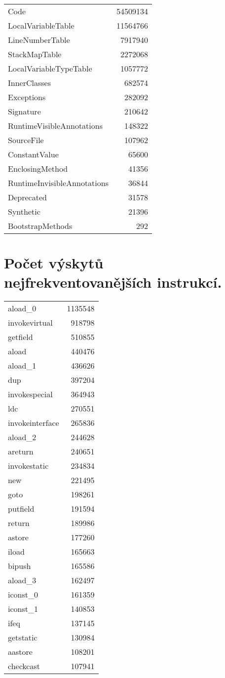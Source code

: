   \begin{tabular}{l r}
	Code	&	54509134	\\
	LocalVariableTable	&	11564766	\\
	LineNumberTable	&	7917940	\\
	StackMapTable	&	2272068	\\
	LocalVariableTypeTable	&	1057772	\\
	InnerClasses	&	682574	\\
	Exceptions	&	282092	\\
	Signature	&	210642	\\
	RuntimeVisibleAnnotations	&	148322	\\
	SourceFile	&	107962	\\
	ConstantValue	&	65600	\\
	EnclosingMethod	&	41356	\\
	RuntimeInvisibleAnnotations	&	36844	\\
	Deprecated	&	31578	\\
	Synthetic	&	21396	\\
	BootstrapMethods	&	292
  \end{tabular}


\section{Počet výskytů nejfrekventovanějších instrukcí.}\label{instf}

  \begin{tabular}{l r}
	aload\_0	&	1135548	\\
	invokevirtual	&	918798	\\
	getfield	&	510855	\\
	aload	&	440476	\\
	aload\_1	&	436626	\\
	dup	&	397204	\\
	invokespecial	&	364943	\\
	ldc	&	270551	\\
	invokeinterface	&	265836	\\
	aload\_2	&	244628	\\
	areturn	&	240651	\\
	invokestatic	&	234834	\\
	new	&	221495	\\
	goto	&	198261	\\
	putfield	&	191594	\\
	return	&	189986	\\
	astore	&	177260	\\
	iload	&	165663	\\
	bipush	&	165586	\\
	aload\_3	&	162497	\\
	iconst\_0	&	161359	\\
	iconst\_1	&	140853	\\
	ifeq	&	137145	\\
	getstatic	&	130984	\\
	aastore	&	108201	\\
	checkcast	&	107941
  \end{tabular}

